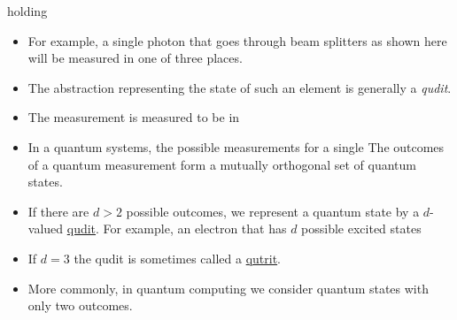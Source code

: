 \begin{frame}{holding}
\begin{itemize}
 \item For example, a single photon that goes through beam splitters as shown here will be measured in one of three places.
    \item The abstraction representing the state of such an element is generally a \emph{qudit}.
    \item The measurement is measured to be in 
    \item In a quantum systems, the possible measurements for a single The outcomes of a quantum measurement form a mutually orthogonal set of quantum states.
    \item If there are $d>2$ possible outcomes, we represent a quantum state by a $d$-valued 
    \href{https://en.wiktionary.org/wiki/qudit}{qudit}.  For example, an electron that has $d$ possible excited states 
    \item If $d=3$ the qudit is sometimes called
    a \href{https://en.wikipedia.org/wiki/Qutrit}{qutrit}.
    \item More commonly, in quantum computing we consider quantum states with only two outcomes.
    
    \end{itemize}
\end{frame}